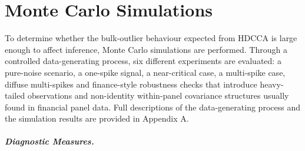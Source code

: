 \documentclass[12pt]{report} %
\begin{document}


\chapter{Monte Carlo Simulations}
\label{ch:MonteCarlo}


To determine whether the bulk-outlier behaviour expected from HDCCA is large enough to affect inference, 
Monte Carlo simulations are performed. Through a controlled data-generating process, six 
different experiments are evaluated: a pure-noise scenario, a one-spike signal, a near-critical case, 
a multi-spike case, diffuse multi-spikes and finance-style robustness checks that introduce heavy-tailed 
observations and non-identity within-panel covariance structures usually found in financial panel data. 
Full descriptions of the data-generating process and the simulation results are provided 
in Appendix A.

\paragraph{Diagnostic Measures.}
\end{document}
